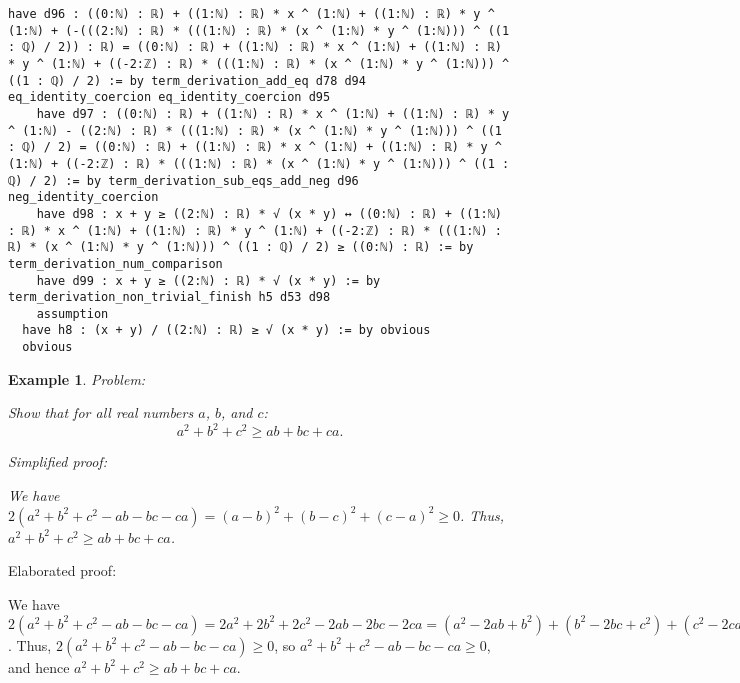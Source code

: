 \documentclass{article}
\newtheorem{example}{Example}
\begin{document}
\begin{tcolorbox}[colback=white!10, width=\linewidth]
\begin{lstlisting}[language=Lean4]
    have d96 : ((0:ℕ) : ℝ) + ((1:ℕ) : ℝ) * x ^ (1:ℕ) + ((1:ℕ) : ℝ) * y ^ (1:ℕ) + (-(((2:ℕ) : ℝ) * (((1:ℕ) : ℝ) * (x ^ (1:ℕ) * y ^ (1:ℕ))) ^ ((1 : ℚ) / 2)) : ℝ) = ((0:ℕ) : ℝ) + ((1:ℕ) : ℝ) * x ^ (1:ℕ) + ((1:ℕ) : ℝ) * y ^ (1:ℕ) + ((-2:ℤ) : ℝ) * (((1:ℕ) : ℝ) * (x ^ (1:ℕ) * y ^ (1:ℕ))) ^ ((1 : ℚ) / 2) := by term_derivation_add_eq d78 d94 eq_identity_coercion eq_identity_coercion d95
    have d97 : ((0:ℕ) : ℝ) + ((1:ℕ) : ℝ) * x ^ (1:ℕ) + ((1:ℕ) : ℝ) * y ^ (1:ℕ) - ((2:ℕ) : ℝ) * (((1:ℕ) : ℝ) * (x ^ (1:ℕ) * y ^ (1:ℕ))) ^ ((1 : ℚ) / 2) = ((0:ℕ) : ℝ) + ((1:ℕ) : ℝ) * x ^ (1:ℕ) + ((1:ℕ) : ℝ) * y ^ (1:ℕ) + ((-2:ℤ) : ℝ) * (((1:ℕ) : ℝ) * (x ^ (1:ℕ) * y ^ (1:ℕ))) ^ ((1 : ℚ) / 2) := by term_derivation_sub_eqs_add_neg d96 neg_identity_coercion
    have d98 : x + y ≥ ((2:ℕ) : ℝ) * √ (x * y) ↔ ((0:ℕ) : ℝ) + ((1:ℕ) : ℝ) * x ^ (1:ℕ) + ((1:ℕ) : ℝ) * y ^ (1:ℕ) + ((-2:ℤ) : ℝ) * (((1:ℕ) : ℝ) * (x ^ (1:ℕ) * y ^ (1:ℕ))) ^ ((1 : ℚ) / 2) ≥ ((0:ℕ) : ℝ) := by term_derivation_num_comparison
    have d99 : x + y ≥ ((2:ℕ) : ℝ) * √ (x * y) := by term_derivation_non_trivial_finish h5 d53 d98
    assumption
  have h8 : (x + y) / ((2:ℕ) : ℝ) ≥ √ (x * y) := by obvious
  obvious

\end{lstlisting}
\end{tcolorbox}


\begin{example}
Problem:
\begin{tcolorbox}[colback=yellow!10, width=\linewidth]
Show that for all real numbers $a$, $b$, and $c$:
    $$a^2 + b^2 + c^2 \geq ab + bc + ca.$$
\end{tcolorbox}

Simplified proof:
\begin{tcolorbox}[colback=blue!10, width=\linewidth]
We have $2(a^2 + b^2 + c^2 - ab - bc - ca) = (a-b)^2 + (b-c)^2 + (c-a)^2 \ge 0$. Thus, $a^2 + b^2 + c^2 \geq ab + bc + ca$.
\end{tcolorbox}
\end{example}

Elaborated proof:
\begin{tcolorbox}[colback=green!10, width=\linewidth]
We have $2(a^2 + b^2 + c^2 - ab - bc - ca) = 2a^2 + 2b^2 + 2c^2 - 2ab - 2bc - 2ca = (a^2 - 2ab + b^2) + (b^2 - 2bc + c^2) + (c^2 - 2ca + a^2) = (a-b)^2 + (b-c)^2 + (c-a)^2 \ge 0$. Thus, $2(a^2 + b^2 + c^2 - ab - bc - ca) \ge 0$, so $a^2 + b^2 + c^2 - ab - bc - ca \ge 0$, and hence $a^2 + b^2 + c^2 \geq ab + bc + ca$.
\end{tcolorbox}
\end{document}
